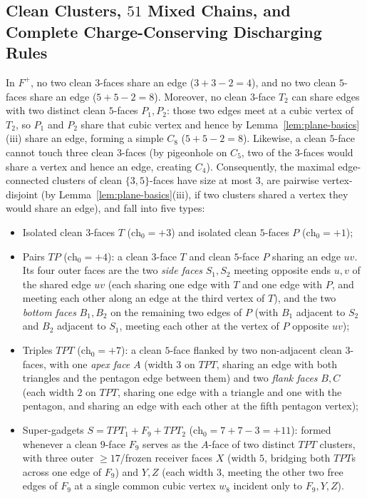 \documentclass[11pt,reqno]{amsart}
\theoremstyle{plain}
\theoremstyle{definition}
\theoremstyle{remark}
\newcommand{\chz}{\mathrm{ch}_0}
\DeclareRobustCommand{\_}{\ifmmode\text{\textunderscore}\else\textunderscore\allowbreak\fi}
\begin{document}
\subsection{Clean Clusters, \texorpdfstring{$51$}{51} Mixed Chains, and Complete Charge-Conserving Discharging Rules}\label{subsec:cubic-rules}

In $F^+$, no two clean $3$-faces share an edge ($3+3-2 = 4$), and no two clean $5$-faces share an edge ($5+5-2 = 8$). Moreover, no clean $3$-face $T_2$ can share edges with two distinct clean $5$-faces $P_1, P_2$: those two edges meet at a cubic vertex of $T_2$, so $P_1$ and $P_2$ share that cubic vertex and hence by Lemma~\ref{lem:plane-basics}(iii) share an edge, forming a simple $C_8$ ($5+5-2=8$). Likewise, a clean $5$-face cannot touch three clean $3$-faces (by pigeonhole on $C_5$, two of the $3$-faces would share a vertex and hence an edge, creating $C_4$). Consequently, the maximal edge-connected clusters of clean $\{3,5\}$-faces have size at most $3$, are pairwise vertex-disjoint (by Lemma~\ref{lem:plane-basics}(iii), if two clusters shared a vertex they would share an edge), and fall into five types:
\begin{itemize}[leftmargin=1.8em]
  \item Isolated clean $3$-faces $T$ ($\chz = +3$) and isolated clean $5$-faces $P$ ($\chz = +1$);
  \item Pairs $TP$ ($\chz = +4$): a clean $3$-face $T$ and clean $5$-face $P$ sharing an edge $uv$. Its four outer faces are the two \emph{side faces} $S_1, S_2$ meeting opposite ends $u, v$ of the shared edge $uv$ (each sharing one edge with $T$ and one edge with $P$, and meeting each other along an edge at the third vertex of $T$), and the two \emph{bottom faces} $B_1, B_2$ on the remaining two edges of $P$ (with $B_1$ adjacent to $S_2$ and $B_2$ adjacent to $S_1$, meeting each other at the vertex of $P$ opposite $uv$);
  \item Triples $TPT$ ($\chz = +7$): a clean $5$-face flanked by two non-adjacent clean $3$-faces, with one \emph{apex face} $A$ (width $3$ on $TPT$, sharing an edge with both triangles and the pentagon edge between them) and two \emph{flank faces} $B, C$ (each width $2$ on $TPT$, sharing one edge with a triangle and one with the pentagon, and sharing an edge with each other at the fifth pentagon vertex);
  \item Super-gadgets $S = TPT_1 + F_9 + TPT_2$ ($\chz = 7 + 7 - 3 = +11$): formed whenever a clean $9$-face $F_9$ serves as the $A$-face of two distinct $TPT$ clusters, with three outer $\ge 17$/frozen receiver faces $X$ (width $5$, bridging both $TPT$s across one edge of $F_9$) and $Y, Z$ (each width $3$, meeting the other two free edges of $F_9$ at a single common cubic vertex $w_8$ incident only to $F_9, Y, Z$).
\end{itemize}
\end{document}
